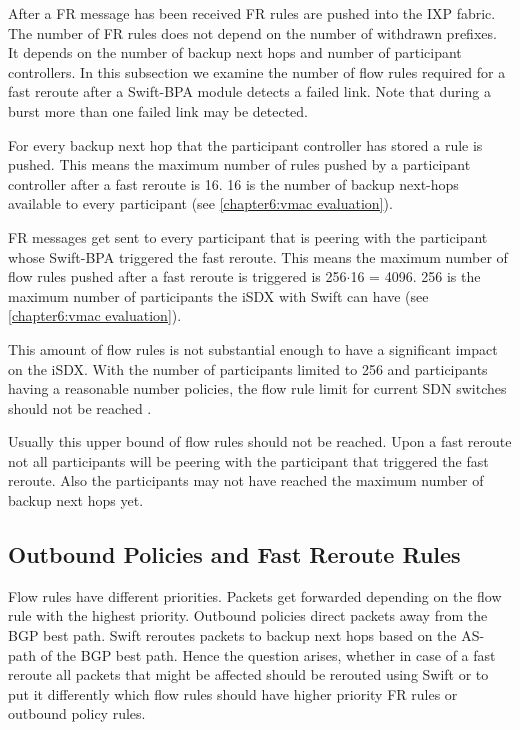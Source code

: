 After a FR message has been received FR rules are pushed into the IXP fabric. The number of FR rules does not depend on the number of withdrawn prefixes. It depends on the number of backup next hops and number of participant controllers. 
In this subsection we examine the number of flow rules required for a fast reroute after a Swift-BPA module detects a failed link. Note that during a burst more than one failed link may be detected. 

For every backup next hop that the participant controller has stored a rule is pushed. This means the maximum number of rules pushed by a participant controller after a fast reroute is 16. 16 is the number of backup next-hops available to every participant (see \ref{chapter6:vmac evaluation}).

FR messages get sent to every participant that is peering with the participant whose Swift-BPA triggered the fast reroute. This means the maximum number of flow rules pushed after a fast reroute is triggered is 256$\cdot$16 = 4096. 256 is the maximum number of participants the iSDX with Swift can have (see \ref{chapter6:vmac evaluation}).

This amount of flow rules is not substantial enough to have a significant impact on the iSDX. With the number of participants limited to 256 and participants having a reasonable number policies, the flow rule limit for current SDN switches should not be reached \cite[Figure 3 (a)]{gupta2016industrial}.

Usually this upper bound of flow rules should not be reached. Upon a fast reroute not all participants will be peering with the participant that triggered the fast reroute. Also the participants may not have reached the maximum number of backup next hops yet.

\newpage

\subsection{\label{chapter6:number of flow rules:outbound_FR}Outbound Policies and Fast Reroute Rules}

Flow rules have different priorities. Packets get forwarded depending on the flow rule with the highest priority. 
Outbound policies direct packets away from the BGP best path. Swift reroutes packets to backup next hops based on the AS-path of the BGP best path. Hence the question arises, whether in case of a fast reroute all packets that might be affected should be rerouted using Swift or to put it differently which flow rules should have higher priority FR rules or outbound policy rules.

